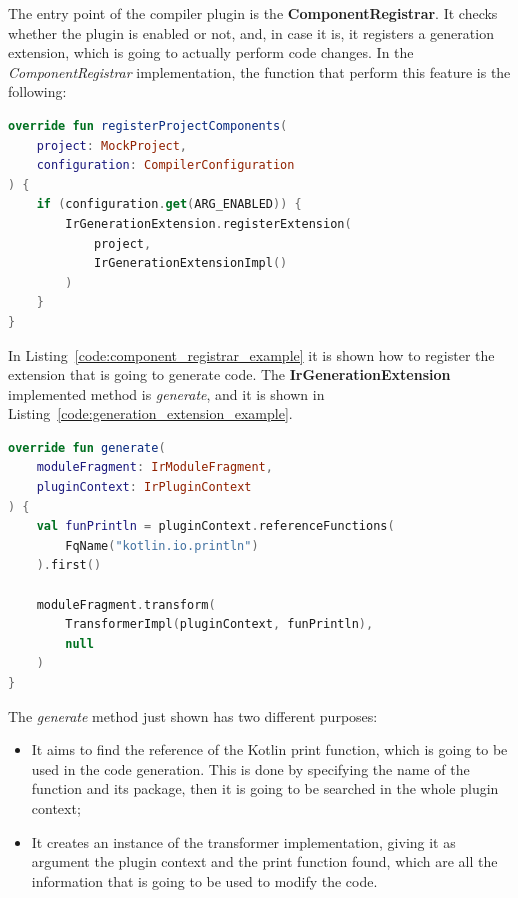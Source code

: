 The entry point of the compiler plugin is the \textbf{ComponentRegistrar}. It checks whether the plugin is enabled or not, and, in case it is, it registers a generation extension, which is going to actually perform code changes. In the \textit{ComponentRegistrar} implementation, the function that perform this feature is the following:
\begin{lstlisting}[caption={Example of registration of extension if the plugin is enabled performed by the \textit{ComponentRegistrar}}, captionpos=b, language=Kotlin, label={code:component_registrar_example}]
override fun registerProjectComponents(
    project: MockProject,
    configuration: CompilerConfiguration
) {
    if (configuration.get(ARG_ENABLED)) {
        IrGenerationExtension.registerExtension(
            project,
            IrGenerationExtensionImpl()
        )
    }
}
\end{lstlisting}
In Listing~\ref{code:component_registrar_example} it is shown how to register the extension that is going to generate code. The \textbf{IrGenerationExtension} implemented method is \textit{generate}, and it is shown in Listing~\ref{code:generation_extension_example}.
\begin{lstlisting}[caption={Example of \textit{IrGenerationExtension} implementation of methos generate}, captionpos=b, language=Kotlin, label={code:generation_extension_example}]
override fun generate(
    moduleFragment: IrModuleFragment,
    pluginContext: IrPluginContext
) {
    val funPrintln = pluginContext.referenceFunctions(
        FqName("kotlin.io.println")
    ).first()

    moduleFragment.transform(
        TransformerImpl(pluginContext, funPrintln),
        null
    )
}
\end{lstlisting}
The \textit{generate} method just shown has two different purposes:
\begin{itemize}
    \item It aims to find the reference of the Kotlin print function, which is going to be used in the code generation. This is done by specifying the name of the function and its package, then it is going to be searched in the whole plugin context;
    \item It creates an instance of the transformer implementation, giving it as argument the plugin context and the print function found, which are all the information that is going to be used to modify the code.
\end{itemize}

